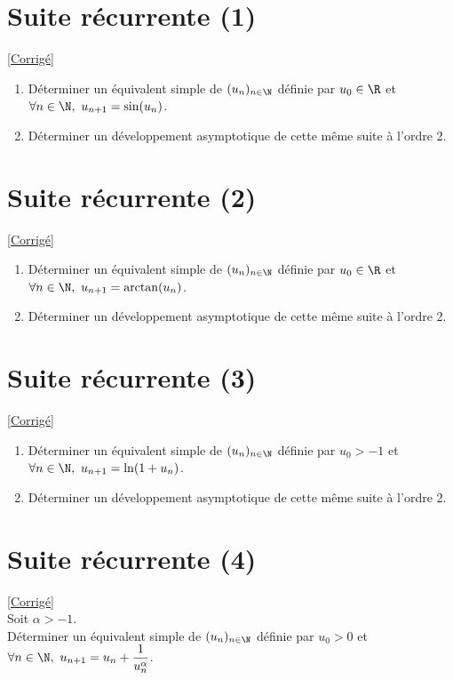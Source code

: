 \documentclass{book}
\begin{document}
	\section{Suite récurrente (1) }
	\textcolor{blue}{\hyperref[sec:suite-recurrente-1-etoile3]{[Corrigé]}}\\
	\label{Suite récurrente 1}
	\begin{enumerate}[leftmargin=*]
		\item Déterminer un équivalent simple de $(u_n)_{n\in \N}$ définie par $u_0\in \R$ et $\forall n\in \N,\ u_{n+1}=\sin(u_n)$. 
		\item Déterminer un développement asymptotique de cette même suite à l'ordre 2.
	\end{enumerate}
	
	\section{Suite récurrente (2) }
	\textcolor{blue}{\hyperref[sec:suite-recurrente-2]{[Corrigé]}}\\
	\label{Suite récurrente 2}
	\begin{enumerate}[leftmargin=*]
		\item Déterminer un équivalent simple de $(u_n)_{n\in \N}$ définie par $u_0\in \R$ et $\forall n\in \N,\ u_{n+1}=\arctan(u_n)$. 
		\item Déterminer un développement asymptotique de cette même suite à l'ordre 2.
	\end{enumerate}
	
	\section{Suite récurrente (3) }
	\textcolor{blue}{\hyperref[sec:suite-recurrente-3]{[Corrigé]}}\\
	\label{Suite récurrente 3}
	\begin{enumerate}[leftmargin=*]
		\item Déterminer un équivalent simple de $(u_n)_{n\in \N}$ définie par $u_0>-1$ et $\forall n\in \N,\ u_{n+1}=\ln(1+u_n)$. 
		\item Déterminer un développement asymptotique de cette même suite à l'ordre 2.
	\end{enumerate}
	
	\section{Suite récurrente (4) }
	\textcolor{blue}{\hyperref[sec:suite-recurrente-4-etoile3]{[Corrigé]}}\\
	\label{Suite récurrente 4}
	Soit $\alpha >-1$.\\
	Déterminer un équivalent simple de $(u_n)_{n\in \N}$ définie par $u_0>0$ et $\forall n\in \N,\ u_{n+1}=u_n+\displaystyle\frac{1}{u_n^\alpha}$.
	
\end{document}
